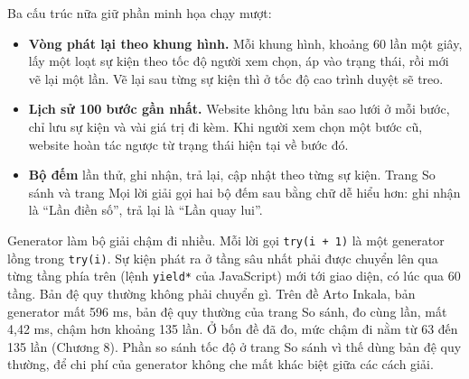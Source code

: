 Ba cấu trúc nữa giữ phần minh họa chạy mượt:

\begin{itemize}
  \item \textbf{Vòng phát lại theo khung hình.} Mỗi khung hình, khoảng 60 lần một giây, lấy một loạt sự kiện theo tốc độ người xem chọn, áp vào trạng thái, rồi mới vẽ lại một lần. Vẽ lại sau từng sự kiện thì ở tốc độ cao trình duyệt sẽ treo.
  \item \textbf{Lịch sử 100 bước gần nhất.} Website không lưu bản sao lưới ở mỗi bước, chỉ lưu sự kiện và vài giá trị đi kèm. Khi người xem chọn một bước cũ, website hoàn tác ngược từ trạng thái hiện tại về bước đó.
  \item \textbf{Bộ đếm} lần thử, ghi nhận, trả lại, cập nhật theo từng sự kiện. Trang So sánh và trang Mọi lời giải gọi hai bộ đếm sau bằng chữ dễ hiểu hơn: ghi nhận là ``Lần điền số'', trả lại là ``Lần quay lui''.
\end{itemize}

Generator làm bộ giải chậm đi nhiều. Mỗi lời gọi \texttt{try(i + 1)} là một generator lồng trong \texttt{try(i)}. Sự kiện phát ra ở tầng sâu nhất phải được chuyển lên qua từng tầng phía trên (lệnh \texttt{yield*} của JavaScript) mới tới giao diện, có lúc qua 60 tầng. Bản đệ quy thường không phải chuyển gì. Trên đề Arto Inkala, bản generator mất 596 ms, bản đệ quy thường của trang So sánh, đo cùng lần, mất 4,42 ms, chậm hơn khoảng 135 lần. Ở bốn đề đã đo, mức chậm đi nằm từ 63 đến 135 lần (Chương 8). Phần so sánh tốc độ ở trang So sánh vì thế dùng bản đệ quy thường, để chi phí của generator không che mất khác biệt giữa các cách giải.
